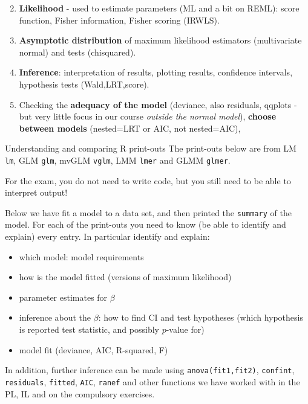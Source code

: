 \documentclass[
  ignorenonframetext,
]{beamer}
\providecommand{\tightlist}{%
  \setlength{\itemsep}{0pt}\setlength{\parskip}{0pt}}
\begin{document}
\begin{frame}
\begin{enumerate}
\setcounter{enumi}{1}
\item
  \textbf{Likelihood} - used to estimate parameters (ML and a bit on
  REML): score function, Fisher information, Fisher scoring (IRWLS).
\item
  \textbf{Asymptotic distribution} of maximum likelihood estimators
  (multivariate normal) and tests (chisquared).
\item
  \textbf{Inference}: interpretation of results, plotting results,
  confidence intervals, hypothesis tests (Wald,LRT,score).
\item
  Checking the \textbf{adequacy of the model} (deviance, also residuals,
  qqplots - but very little focus in our course \emph{outside the normal
  model}), \textbf{choose between models} (nested=LRT or AIC, not
  nested=AIC),
\end{enumerate}
\end{frame}

\begin{frame}[fragile]{Understanding and comparing R print-outs}
\protect\hypertarget{understanding-and-comparing-r-print-outs}{}
The print-outs below are from LM \texttt{lm}, GLM \texttt{glm}, mvGLM
\texttt{vglm}, LMM \texttt{lmer} and GLMM \texttt{glmer}.

For the exam, you do not need to write code, but you still need to be
able to interpret output!
\end{frame}

\begin{frame}[fragile]
Below we have fit a model to a data set, and then printed the
\texttt{summary} of the model. For each of the print-outs you need to
know (be able to identify and explain) every entry. In particular
identify and explain:

\begin{itemize}
\tightlist
\item
  which model: model requirements
\item
  how is the model fitted (versions of maximum likelihood)
\item
  parameter estimates for \(\beta\)
\item
  inference about the \(\beta\): how to find CI and test hypotheses
  (which hypothesis is reported test statistic, and possibly \(p\)-value
  for)
\item
  model fit (deviance, AIC, R-squared, F)
\end{itemize}

In addition, further inference can be made using
\texttt{anova(fit1,fit2)}, \texttt{confint}, \texttt{residuals},
\texttt{fitted}, \texttt{AIC}, \texttt{ranef} and other functions we
have worked with in the PL, IL and on the compulsory exercises.
\end{frame}
\end{document}
